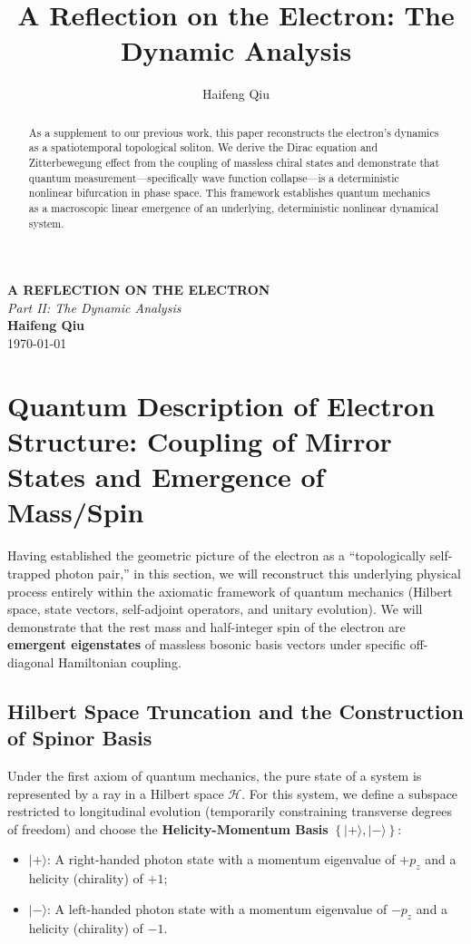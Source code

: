 \documentclass[12pt, a4paper]{article}
\title{A Reflection on the Electron: The Dynamic Analysis}
\author{Haifeng Qiu}
\begin{document}
\begin{center}
    {\uppercase{\Large \textbf{A Reflection on the Electron}}} \\
    \vspace{0.5em}
    {\large \textit{Part II: The Dynamic Analysis}} \\
    \vspace{2em}
    \textbf{Haifeng Qiu} \\
    \today
    \vspace{2em}
\end{center}



\begin{abstract}
As a supplement to our previous work, this paper reconstructs the electron's dynamics as a spatiotemporal topological soliton. We derive the Dirac equation and Zitterbewegung effect from the coupling of massless chiral states and demonstrate that quantum measurement—specifically wave function collapse—is a deterministic nonlinear bifurcation in phase space. This framework establishes quantum mechanics as a macroscopic linear emergence of an underlying, deterministic nonlinear dynamical system.
\end{abstract}

\vspace{2em}


\section{Quantum Description of Electron Structure: Coupling of Mirror States and Emergence of Mass/Spin}

Having established the geometric picture of the electron as a ``topologically self-trapped photon pair,'' in this section, we will reconstruct this underlying physical process entirely within the axiomatic framework of quantum mechanics (Hilbert space, state vectors, self-adjoint operators, and unitary evolution). We will demonstrate that the rest mass and half-integer spin of the electron are \textbf{emergent eigenstates} of massless bosonic basis vectors under specific off-diagonal Hamiltonian coupling.

\subsection{Hilbert Space Truncation and the Construction of Spinor Basis}

Under the first axiom of quantum mechanics, the pure state of a system is represented by a ray in a Hilbert space $\mathcal{H}$. For this system, we define a subspace restricted to longitudinal evolution (temporarily constraining transverse degrees of freedom) and choose the \textbf{Helicity-Momentum Basis} $\left\{ |+\rangle, |-\rangle \right\}$:
\begin{itemize}
    \item $|+\rangle$: A right-handed photon state with a momentum eigenvalue of $+p_z$ and a helicity (chirality) of $+1$;
    \item $|-\rangle$: A left-handed photon state with a momentum eigenvalue of $-p_z$ and a helicity (chirality) of $-1$.
\end{itemize}
\end{document}
